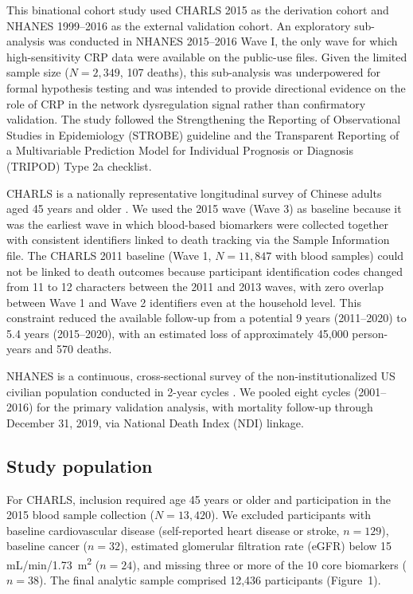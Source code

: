 \documentclass[11pt,a4paper]{article}
\begin{document}
This binational cohort study used CHARLS 2015 as the derivation cohort and NHANES 1999--2016 as the external validation cohort. An exploratory sub-analysis was conducted in NHANES 2015--2016 Wave I, the only wave for which high-sensitivity CRP data were available on the public-use files. Given the limited sample size ($N = 2{,}349$, 107 deaths), this sub-analysis was underpowered for formal hypothesis testing and was intended to provide directional evidence on the role of CRP in the network dysregulation signal rather than confirmatory validation. The study followed the Strengthening the Reporting of Observational Studies in Epidemiology (STROBE) guideline and the Transparent Reporting of a Multivariable Prediction Model for Individual Prognosis or Diagnosis (TRIPOD) Type 2a checklist.

CHARLS is a nationally representative longitudinal survey of Chinese adults aged 45 years and older \cite{zhao2014charls}. We used the 2015 wave (Wave 3) as baseline because it was the earliest wave in which blood-based biomarkers were collected together with consistent identifiers linked to death tracking via the Sample Information file. The CHARLS 2011 baseline (Wave 1, $N = 11{,}847$ with blood samples) could not be linked to death outcomes because participant identification codes changed from 11 to 12 characters between the 2011 and 2013 waves, with zero overlap between Wave 1 and Wave 2 identifiers even at the household level. This constraint reduced the available follow-up from a potential 9 years (2011--2020) to 5.4 years (2015--2020), with an estimated loss of approximately 45,000 person-years and 570 deaths.

NHANES is a continuous, cross-sectional survey of the non-institutionalized US civilian population conducted in 2-year cycles \cite{zipf2013nhanes}. We pooled eight cycles (2001--2016) for the primary validation analysis, with mortality follow-up through December 31, 2019, via National Death Index (NDI) linkage.

\subsection{Study population}

For CHARLS, inclusion required age 45 years or older and participation in the 2015 blood sample collection ($N = 13{,}420$). We excluded participants with baseline cardiovascular disease (self-reported heart disease or stroke, $n = 129$), baseline cancer ($n = 32$), estimated glomerular filtration rate (eGFR) below 15 mL/min/1.73~m\textsuperscript{2} ($n = 24$), and missing three or more of the 10 core biomarkers ($n = 38$). The final analytic sample comprised 12,436 participants (Figure~1).
\end{document}
